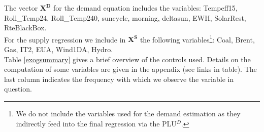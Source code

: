The vector $\boldsymbol{X^D}$ for the demand equation includes the variables: Tempeff15, Roll\_Temp24, Roll\_Temp240, suncycle, morning, deltasun, EWH, SolarRest, RteBlackBox.\\

For the supply regression we include in $\boldsymbol{X^S}$ the following variables\footnote{We do not include the variables used for the demand estimation as they indirectly feed into the final regression via the PLU$^D$.}: 
Coal, Brent, Gas, IT2, EUA, Wind1DA, Hydro. \\
 
Table \ref{exogsummary} gives a brief overview of the controls used. Details on the computation of some variables are given in the appendix (see links in table). The last column indicates the frequency with which we observe the variable in question. 

